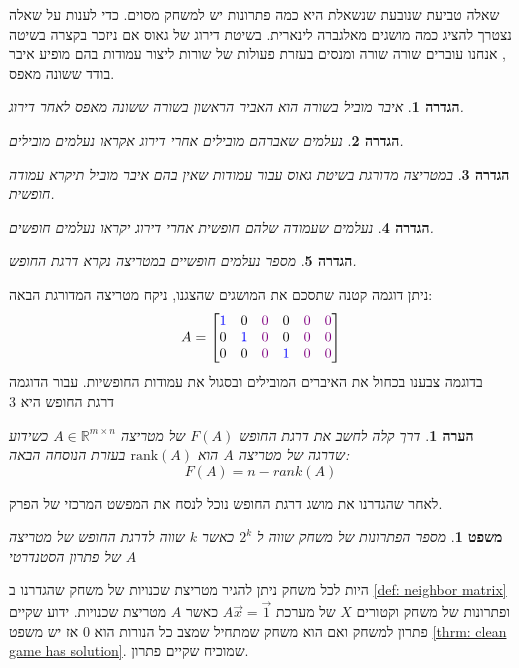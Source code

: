 \documentclass[12pt,leqno]{article}
\theoremstyle{theoremdd}
\newtheorem{definition}{הגדרה}[section]
\newtheorem{theorem}{משפט}[section]
\newtheorem{comm}{הערה}[section]
\begin{document}
שאלה טביעת שנובעת שנשאלת היא כמה פתרונות יש למשחק מסוים.
כדי לענות על שאלה נצטרך להציג כמה מושגים מאלגברה לינארית.
בשיטת דירוג של גאוס אם ניזכר בקצרה בשיטה ,
אנחנו עוברים שורה שורה ומנסים בעזרת פעולות של שורות 
ליצור עמודות בהם מופיע איבר בודד ששונה מאפס.
\begin{definition}
    איבר מוביל בשורה הוא האביר הראשון בשורה ששונה מאפס 
    לאחר דירוג.
\end{definition}
\begin{definition}
    נעלמים שאברהם מובילים אחרי דירוג אקראו נעלמים מובילים.
\end{definition}
\begin{definition}
    במטריצה מדורגת בשיטת גאוס עבור עמודות שאין בהם איבר מוביל 
    תיקרא עמודה חופשית.
\end{definition}
\begin{definition}
    נעלמים שעמודה שלהם חופשית אחרי דירוג יקראו נעלמים חופשים.
\end{definition}
\begin{definition}
    מספר נעלמים חופשיים במטריצה נקרא
    דרגת החופש.
\end{definition}
ניתן דוגמה קטנה שתסכם את המושגים שהצגנו,
ניקח מטריצה  המדורגת הבאה:
\[
    A = \begin{bmatrix}
        {\color{blue}1} & 0 &  {\color{violet}0} & 0 &  {\color{violet}0} &  {\color{violet}0}\\
        0 &{\color{blue}1} & {\color{violet}0} & 0  &  {\color{violet}0} &  {\color{violet}0}\\
        0 & 0 &  {\color{violet}0} &{\color{blue}1} &  {\color{violet}0} &  {\color{violet}0}
    \end{bmatrix}
\]
בדוגמה צבענו בכחול את האיברים המובילים
ובסגול את עמודות החופשיות.
עבור הדוגמה דרגת החופש היא 3
\begin{comm}
    דרך קלה לחשב את דרגת החופש
    $F(A)$
    של מטריצה 
    $A \in\mathbb{R}^{m \times n}$
    כשידוע שדרגה של מטריצה
    $A$
    הוא 
    $\mathrm{rank}(A) $
    בעזרת הנוסחה הבאה:
    \[
        F(A) = n - rank(A)
    \]
\end{comm}
לאחר שהגדרנו את מושג דרגת החופש נוכל לנסח את המפשט המרכזי של הפרק.
\begin{theorem}
    מספר הפתרונות של משחק 
    שווה ל 
    $2^{k}$
    כאשר 
    $k$
    שווה לדרגת החופש של מטריצה
    $A$
    של פתרון הסטנדרטי
\end{theorem}
היות לכל משחק ניתן להגיר מטריצת שכנויות של משחק שהגדרנו 
ב
\ref{def: neighbor matrix}
ופתרונות של משחק וקטורים
$X$
של מערכת
$A \vec x = \vec{1}$
כאשר 
$A$
מטריצת שכנויות.
ידוע שקיים פתרון למשחק ואם הוא משחק שמתחיל שמצב כל הנורות הוא
$0$
אז יש משפט 
\ref{thrm: clean game has solution}.
שמוכיח שקיים פתרון.
\end{document}
